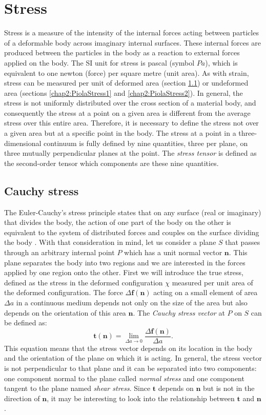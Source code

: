 \section{Stress}
Stress is a measure of the intensity of the internal forces acting between particles of a deformable body across imaginary internal surfaces. These internal forces are produced between the particles in the body as a reaction to external forces applied on the body. The SI unit for stress is pascal (symbol $Pa$), which is equivalent to one newton (force) per square metre (unit area). As with strain, stress can be measured per unit of deformed area (section \ref{chap2:CauchyStress}) or undeformed area (sections \ref{chap2:PiolaStress1} and \ref{chap2:PiolaStress2}). In general, the stress is not uniformly distributed over the cross section of a material body, and consequently the stress at a point on a given area is different from the average stress over this entire area. Therefore, it is necessary to define the stress not over a given area but at a specific point in the body. \ON The stress at a point in a three-dimensional continuum is fully defined by \OFF nine quantities, three per plane, on three mutually perpendicular planes at the point. \ON The \emph{stress tensor} is defined as the second-order tensor which components are these nine quantities. \OFF 

	\subsection{Cauchy stress}\label{chap2:CauchyStress}
The Euler-Cauchy's stress principle states that on any surface (real or imaginary) that divides the body, the action of one part of the body on the other is equivalent to the system of distributed forces and couples on the surface dividing the body \citep{Truesdell60}. With that consideration in mind, let us consider a plane $S$ that passes through an arbitrary internal point $P$ which has a unit normal vector $\mathbf{n}$. This plane separates the body into two regions and we are interested in the forces applied by one region onto the other. First we will introduce the true stress, defined as the stress in the deformed configuration $\chi$ measured per unit area of the deformed configuration. The force $\Delta\mathbf{f}(\mathbf{n})$ acting on a small element of area $\Delta a$ in a continuous medium depends not only on the size of the area but also depends on the orientation of this area $\mathbf{n}$. The \emph{Cauchy stress vector} at $P$ on $S$ can be defined as:
\begin{equation}
\mathbf{t}(\mathbf{n}) = \lim_{\Delta a \to 0} \frac{\Delta \mathbf{f}(\mathbf{n})}{\Delta a}.
\end{equation}
This equation means that the stress vector depends on its location in the body and the orientation of the plane on which it is acting. In general, the stress vector is not perpendicular to that plane and it can be separated into two components: one component normal to the plane called \emph{normal stress} and one component tangent to the plane named \emph{shear stress}. Since $\mathbf{t}$ depends on $\mathbf{n}$ but is not in the direction of $\mathbf{n}$, it may be interesting to look into the relationship between $\mathbf{t}$ and $\mathbf{n}$. 

